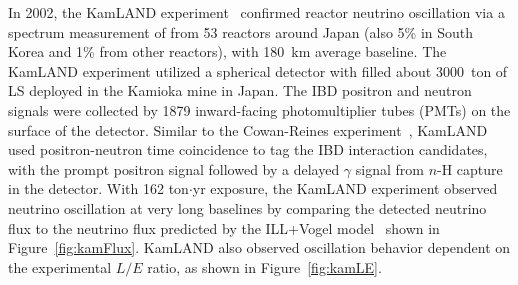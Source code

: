     In 2002, the KamLAND experiment~\cite{bib:KamLAND03, bib:kamland04} confirmed reactor neutrino oscillation via a spectrum measurement of \nuebar from 53 reactors around Japan (also 5\% in South Korea and 1\% from other reactors), with 180~km average baseline.
    The KamLAND experiment utilized a spherical detector with filled about 3000~ton of LS deployed in the Kamioka mine in Japan. 
    The IBD positron and neutron signals were collected by 1879 inward-facing photomultiplier tubes (PMTs) on the surface of the detector. 
    Similar to the Cowan-Reines experiment~\cite{bib:CowanReines}, KamLAND used positron-neutron time coincidence to tag the IBD interaction candidates, with the prompt positron signal followed by a delayed $\gamma$ signal from $n$-H capture in the detector.
    With 162 ton$\cdot$yr exposure, the KamLAND experiment observed neutrino oscillation at very long baselines by comparing the detected neutrino flux to the neutrino flux predicted by the ILL+Vogel model~\cite{bib:ILL1982, bib:ILL1985, bib:ILL1989, bib:vogel} shown in Figure~\ref{fig:kamFlux}.
    KamLAND also observed oscillation behavior dependent on the experimental $L/E$ ratio, as shown in Figure~\ref{fig:kamLE}.
    
